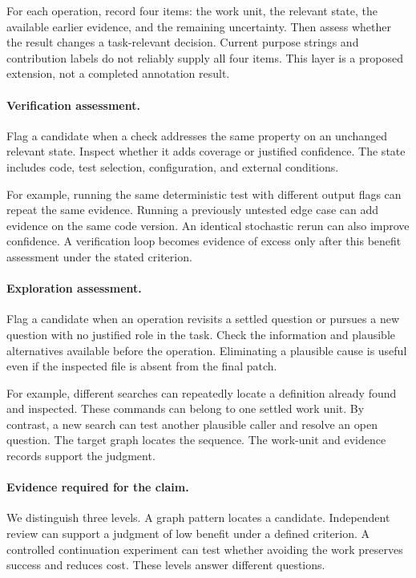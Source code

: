 \documentclass[10pt,a4paper,twocolumn]{article}
\begin{document}
For each operation, record four items: the work unit, the relevant state, the available earlier evidence, and the remaining uncertainty. Then assess whether the result changes a task-relevant decision. Current purpose strings and contribution labels do not reliably supply all four items. This layer is a proposed extension, not a completed annotation result.

\paragraph{Verification assessment.}
Flag a candidate when a check addresses the same property on an unchanged relevant state. Inspect whether it adds coverage or justified confidence. The state includes code, test selection, configuration, and external conditions.

For example, running the same deterministic test with different output flags can repeat the same evidence. Running a previously untested edge case can add evidence on the same code version. An identical stochastic rerun can also improve confidence. A verification loop becomes evidence of excess only after this benefit assessment under the stated criterion.

\paragraph{Exploration assessment.}
Flag a candidate when an operation revisits a settled question or pursues a new question with no justified role in the task. Check the information and plausible alternatives available before the operation. Eliminating a plausible cause is useful even if the inspected file is absent from the final patch.

For example, different searches can repeatedly locate a definition already found and inspected. These commands can belong to one settled work unit. By contrast, a new search can test another plausible caller and resolve an open question. The target graph locates the sequence. The work-unit and evidence records support the judgment.

\paragraph{Evidence required for the claim.}
We distinguish three levels. A graph pattern locates a candidate. Independent review can support a judgment of low benefit under a defined criterion. A controlled continuation experiment can test whether avoiding the work preserves success and reduces cost. These levels answer different questions.
\end{document}
